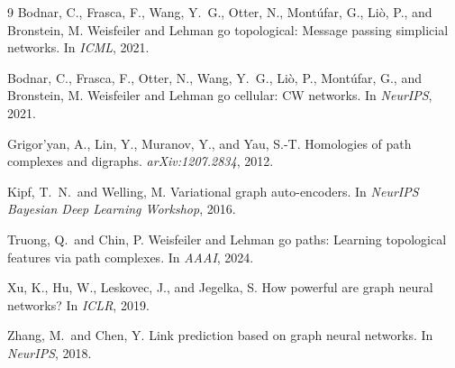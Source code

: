 \documentclass[11pt]{article}
\begin{document}

\begin{thebibliography}{9}
  Bodnar, C., Frasca, F., Wang, Y.~G., Otter, N., Mont\'ufar, G., Li\`o, P.,
  and Bronstein, M.
  \newblock Weisfeiler and Lehman go topological: Message passing simplicial
  networks.
  \newblock In \emph{ICML}, 2021.

  Bodnar, C., Frasca, F., Otter, N., Wang, Y.~G., Li\`o, P., Mont\'ufar, G.,
  and Bronstein, M.
  \newblock Weisfeiler and Lehman go cellular: CW networks.
  \newblock In \emph{NeurIPS}, 2021.

  Grigor'yan, A., Lin, Y., Muranov, Y., and Yau, S.-T.
  \newblock Homologies of path complexes and digraphs.
  \newblock \emph{arXiv:1207.2834}, 2012.

  Kipf, T.~N.\ and Welling, M.
  \newblock Variational graph auto-encoders.
  \newblock In \emph{NeurIPS Bayesian Deep Learning Workshop}, 2016.

  Truong, Q.\ and Chin, P.
  \newblock Weisfeiler and Lehman go paths: Learning topological features via
  path complexes.
  \newblock In \emph{AAAI}, 2024.

  Xu, K., Hu, W., Leskovec, J., and Jegelka, S.
  \newblock How powerful are graph neural networks?
  \newblock In \emph{ICLR}, 2019.

  Zhang, M.\ and Chen, Y.
  \newblock Link prediction based on graph neural networks.
  \newblock In \emph{NeurIPS}, 2018.
\end{thebibliography}
\end{document}
